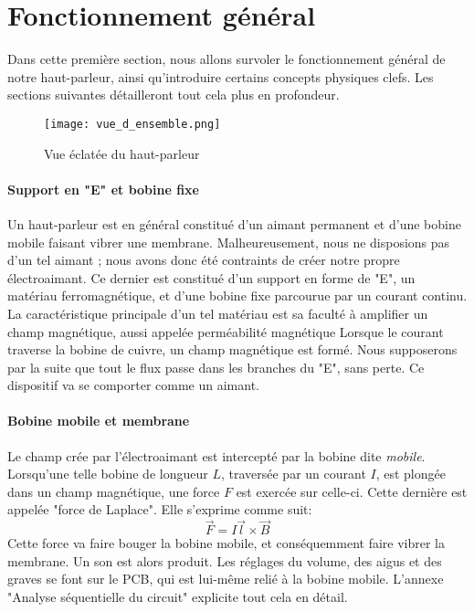 

\section{Fonctionnement général}

Dans cette première section, nous allons survoler le fonctionnement général de notre haut-parleur, ainsi 
qu'introduire certains concepts physiques clefs. Les sections suivantes détailleront tout cela plus en 
profondeur.

\begin{figure}[ht!] 
\centering 
\texttt{[image: vue\_d\_ensemble.png]} 
\caption{Vue éclatée du haut-parleur} 
\label{hp-scheme} 
\end{figure}

\paragraph{Support en "E" et bobine fixe}
Un haut-parleur est en général constitué d'un aimant permanent et d'une bobine mobile faisant vibrer une 
membrane. Malheureusement, nous ne disposions pas d'un tel aimant ; nous avons donc été contraints de créer
notre propre électroaimant. Ce dernier est constitué d'un support en forme de "E", un matériau ferromagnétique, et 
d'une bobine fixe parcourue par un courant continu. La caractéristique principale d'un tel matériau est sa 
faculté à amplifier un champ magnétique, aussi appelée perméabilité magnétique \cite{wiki-perm-magn}
Lorsque le courant traverse la bobine de cuivre, un champ magnétique est formé. Nous supposerons par la 
suite que tout le flux passe dans les branches du "E", sans perte. Ce dispositif va se comporter comme un
aimant.

\paragraph{Bobine mobile et membrane}
Le champ crée par l'électroaimant est intercepté par la bobine dite \textit{mobile}. Lorsqu'une telle bobine
de longueur $L$, traversée par un courant $I$, est plongée dans un champ magnétique, une force $F$ est exercée
sur celle-ci. Cette dernière est appelée "force de Laplace". Elle s'exprime comme suit:
$$\vec{F} = I\vec{l}\times{\vec{B}}$$ 
Cette force va faire bouger la bobine mobile, et conséquemment faire vibrer la membrane. Un son est alors 
produit. Les réglages du volume, des aigus et des graves se font sur le PCB, qui est lui-même relié à la
bobine mobile. L'annexe "Analyse séquentielle du circuit" explicite tout cela en détail.

